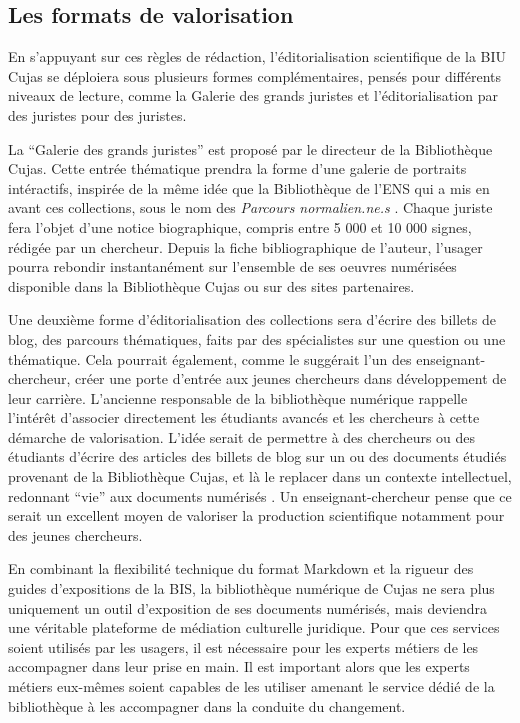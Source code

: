 \subsection{Les formats de valorisation}
En s'appuyant sur ces règles de rédaction, l'éditorialisation scientifique de la \ac{BIU Cujas} se déploiera sous plusieurs formes complémentaires, pensés pour différents niveaux de lecture, comme la Galerie des grands juristes et l'éditorialisation par des juristes pour des juristes.

La \enquote{Galerie des grands juristes} est proposé par le directeur de la Bibliothèque Cujas. Cette entrée thématique prendra la forme d'une galerie de portraits intéractifs, inspirée de la même idée que la Bibliothèque de l'\ac{ENS} qui a mis en avant ces collections, sous le nom des \textit{Parcours normalien.ne.s} . Chaque juriste fera l'objet d'une notice biographique, compris entre 5 000 et 10 000 signes, rédigée par un chercheur. Depuis la fiche bibliographique de l'auteur, l'usager pourra rebondir instantanément sur l'ensemble de ses oeuvres numérisées disponible dans la Bibliothèque Cujas ou sur des sites partenaires.

Une deuxième forme d'éditorialisation des collections sera d'écrire des billets de blog, des parcours thématiques, faits par des spécialistes sur une question ou une thématique. Cela pourrait également, comme le suggérait l'un des enseignant-chercheur, créer une porte d'entrée aux jeunes chercheurs dans développement de leur carrière. L'ancienne responsable de la bibliothèque numérique rappelle l'intérêt d'associer directement les étudiants avancés et les chercheurs à cette démarche de valorisation. L'idée serait de permettre à des chercheurs ou des étudiants d'écrire des articles des billets de blog sur un ou des documents étudiés provenant de la Bibliothèque Cujas, et là le replacer dans un contexte intellectuel, redonnant \enquote{vie} aux documents numérisés . Un enseignant-chercheur pense que ce serait un excellent moyen de valoriser la production scientifique notamment pour des jeunes chercheurs.

En combinant la flexibilité technique du format Markdown et la rigueur des guides d'expositions de la \ac{BIS}, la bibliothèque numérique de Cujas ne sera plus uniquement un outil d'exposition de ses documents numérisés, mais deviendra une véritable plateforme de médiation culturelle juridique. Pour que ces services soient utilisés par les usagers, il est nécessaire pour les experts métiers de les accompagner dans leur prise en main. Il est important alors que les experts métiers eux-mêmes soient capables de les utiliser amenant le service dédié de la bibliothèque à les accompagner dans la conduite du changement.